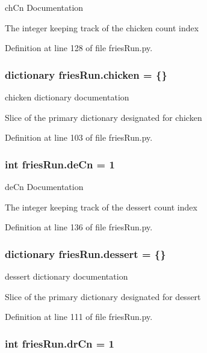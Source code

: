 ch\-Cn Documentation 

The integer keeping track of the chicken count index 

Definition at line 128 of file fries\-Run.\-py.

\hypertarget{namespacefriesRun_a6200fc96d1f7e471466a1701e23857af}{
\subsubsection[{chicken}]{\setlength{\rightskip}{0pt plus 5cm}dictionary fries\-Run.\-chicken = \{\}}}\label{namespacefriesRun_a6200fc96d1f7e471466a1701e23857af}


chicken dictionary documentation 

Slice of the primary dictionary designated for chicken 

Definition at line 103 of file fries\-Run.\-py.

\hypertarget{namespacefriesRun_a4b5354844d1430a74f7dda25b3752c3e}{
\subsubsection[{de\-Cn}]{\setlength{\rightskip}{0pt plus 5cm}int fries\-Run.\-de\-Cn = 1}}\label{namespacefriesRun_a4b5354844d1430a74f7dda25b3752c3e}


de\-Cn Documentation 

The integer keeping track of the dessert count index 

Definition at line 136 of file fries\-Run.\-py.

\hypertarget{namespacefriesRun_ac1ffacbfec335b361aec6334e2552d0d}{
\subsubsection[{dessert}]{\setlength{\rightskip}{0pt plus 5cm}dictionary fries\-Run.\-dessert = \{\}}}\label{namespacefriesRun_ac1ffacbfec335b361aec6334e2552d0d}


dessert dictionary documentation 

Slice of the primary dictionary designated for dessert 

Definition at line 111 of file fries\-Run.\-py.

\hypertarget{namespacefriesRun_a6fa160973a48aed64087bcedd21682b6}{
\subsubsection[{dr\-Cn}]{\setlength{\rightskip}{0pt plus 5cm}int fries\-Run.\-dr\-Cn = 1}}\label{namespacefriesRun_a6fa160973a48aed64087bcedd21682b6}


